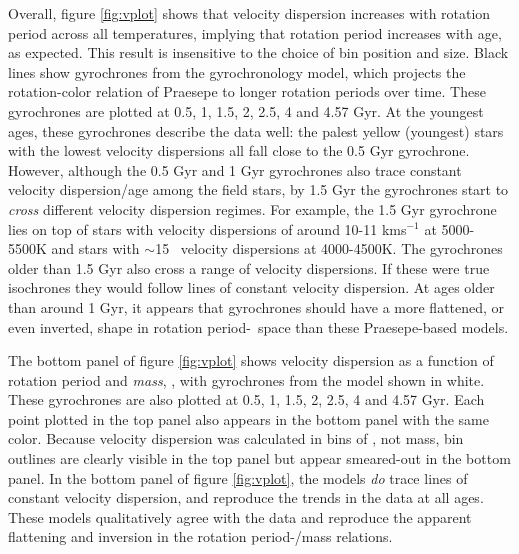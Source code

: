Overall, figure \ref{fig:vplot} shows that velocity dispersion increases with
rotation period across all temperatures, implying that rotation period
increases with age, as expected.
This result is insensitive to the choice of bin position and size.
Black lines show gyrochrones from the \citet{angus2019} gyrochronology model,
which projects the rotation-color relation of Praesepe to longer rotation
periods over time.
These gyrochrones are plotted at 0.5, 1, 1.5, 2, 2.5, 4 and 4.57 Gyr.
At the youngest ages, these gyrochrones describe the data well: the palest
yellow (youngest) stars with the lowest velocity dispersions all fall close to
the 0.5 Gyr gyrochrone.
However, although the 0.5 Gyr and 1 Gyr gyrochrones also trace constant
velocity dispersion/age among the field stars, by 1.5 Gyr the gyrochrones
start to {\it cross} different velocity dispersion regimes.
For example, the 1.5 Gyr gyrochrone lies on top of stars with velocity
dispersions of around 10-11 kms$^{-1}$ at 5000-5500K and stars with $\sim$15
\kms\ velocity dispersions at 4000-4500K.
The gyrochrones older than 1.5 Gyr also cross a range of velocity dispersions.
If these were true isochrones they would follow lines of constant velocity
dispersion.
At ages older than around 1 Gyr, it appears that gyrochrones should have a
more flattened, or even inverted, shape in rotation period-\teff\ space than
these Praesepe-based models.

The bottom panel of figure \ref{fig:vplot} shows velocity dispersion as a
function of rotation period and {\it mass}, \citep[from][]{berger2020}, with
gyrochrones from the \citep{spada2019} model shown in white.
These gyrochrones are also plotted at 0.5, 1, 1.5, 2, 2.5, 4 and 4.57 Gyr.
Each point plotted in the top panel also appears in the bottom panel with the
same color.
Because velocity dispersion was calculated in bins of \teff, not mass, bin
outlines are clearly visible in the top panel but appear smeared-out in the
bottom panel.
In the bottom panel of figure \ref{fig:vplot}, the \citet{spada2019} models
{\it do} trace lines of constant velocity dispersion, and reproduce the trends
in the data at all ages.
These models qualitatively agree with the data and reproduce the apparent
flattening and inversion in the rotation period-\teff/mass relations.

